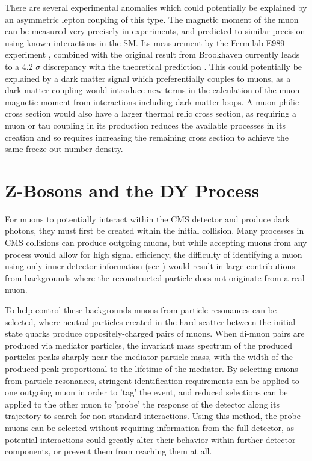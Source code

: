 There are several experimental anomalies which could potentially be explained by an asymmetric lepton coupling of this type.
The magnetic moment of the muon can be measured very precisely in experiments, and predicted to similar precision using known interactions in the SM.
Its measurement by the Fermilab E989 experiment \cite{gminus2}, combined with the original result from Brookhaven \cite{gminus2_bnl} currently leads to a 4.2 $\sigma$ discrepancy with the theoretical prediction \cite{gminus2_theory}. 
This could potentially be explained by a dark matter signal which preferentially couples to muons, as a dark matter coupling would introduce new terms in the calculation of the muon magnetic moment from interactions including dark matter loops.
A muon-philic cross section would also have a larger thermal relic cross section, as requiring a muon or tau coupling in its production reduces the available processes in its creation and so requires increasing the remaining cross section to achieve the same freeze-out number density.

\section{Z-Bosons and the DY Process}
For muons to potentially interact within the CMS detector and produce dark photons, they must first be created within the initial collision.
Many processes in CMS collisions can produce outgoing muons, but while accepting muons from any process would allow for high signal efficiency, the difficulty of identifying a muon using only inner detector information (see ) would result in large contributions from backgrounds where the reconstructed particle does not originate from a real muon.

To help control these backgrounds muons from particle resonances can be selected, where neutral particles created in the hard scatter between the initial state quarks produce oppositely-charged pairs of muons.
When di-muon pairs are produced via mediator particles, the invariant mass spectrum of the produced particles peaks sharply near the mediator particle mass, with the width of the produced peak proportional to the lifetime of the mediator. 
By selecting muons from particle resonances, stringent identification requirements can be applied to one outgoing muon in order to 'tag' the event, and reduced selections can be applied to the other muon to 'probe' the response of the detector along its trajectory to search for non-standard interactions. 
Using this method, the probe muons can be selected without requiring information from the full detector, as potential \dbrem interactions could greatly alter their behavior within further detector components, or prevent them from reaching them at all.

